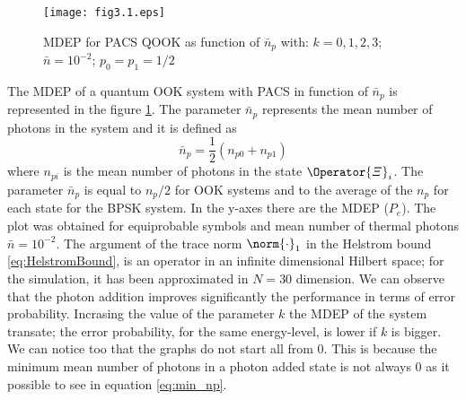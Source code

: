     \begin{figure}[t]
        \begin{center}
            \texttt{[image: fig3.1.eps]}
            \caption{MDEP for PACS QOOK as function of $\bar{n}_p$ with: $k=0,1,2,3$; $\bar{n}=10^{-2}$; $p_0=p_1=1/2$}
            \label{fig:3.1}
        \end{center}
    \end{figure}
    The MDEP of a quantum OOK system with PACS in function of $\bar{n}_p$ is represented in the figure
    \ref{fig:3.1}. The parameter $\bar{n}_p$ represents the mean number of photons in the system and it is 
    defined as
    \begin{equation*}
        \bar{n}_p=\frac{1}{2} \left(n_{p0}+n_{p1}\right)
    \end{equation*}
    where $n_{pi}$ is the mean number of photons in the state $\Operator{\varXi}_i$.
    The parameter $\bar{n}_p$ is equal to $n_p/2$ for OOK systems and to the average of the $n_p$ for 
    each state for the BPSK system.
    In the y-axes there are the MDEP ($P_e$). The plot was obtained for equiprobable symbols and 
    mean number of thermal photons $\bar{n}=10^{-2}$.  
    The argument of the trace norm $\norm{\cdot}_1$ in the Helstrom bound 
    \ref{eq:HelstromBound}, is an operator in an infinite dimensional Hilbert space; for the 
    simulation, it has been approximated in $N=30$ dimension.
    We can observe that the photon addition improves significantly the performance in terms
    of error probability. Incrasing the value of the parameter $k$ the MDEP of the system 
    transate; the error probability, for the same energy-level, is lower if $k$ is bigger.
    We can notice too that the graphs do not start all from $0$. This is because the minimum
    mean number of photons in a photon added state is not always $0$ as it possible to see in 
    equation \ref{eq:min_np}.  

